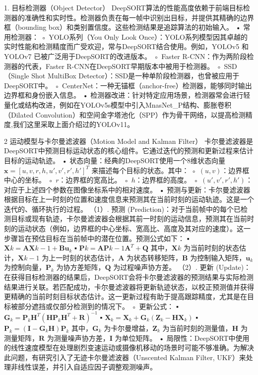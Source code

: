 1. 目标检测器（Object Detector）
DeepSORT算法的性能高度依赖于前端目标检测器的准确性和实时性。检测器负责在每一帧中识别出目标，并提供其精确的边界框（bounding box）和类别置信度。这些检测结果是追踪算法的初始输入。
• 常用检测器：
    ◦ YOLO系列（You Only Look Once）：YOLO系列模型因其卓越的实时性能和检测精度而广受欢迎，常与DeepSORT结合使用。例如，YOLOv5 和YOLOv7 已被广泛用于DeepSORT的改进版本。
    ◦ Faster R-CNN：作为两阶段检测器的代表，Faster R-CNN在DeepSORT早期版本中被用于检测器。
    ◦ SSD（Single Shot MultiBox Detector）：SSD是一种单阶段检测器，也曾被应用于DeepSORT中。
    ◦ CenterNet：一种无锚框（anchor-free）检测器，能够同时输出边界框和身份嵌入信息。
• 检测器改进：针对特定应用场景，检测器常会进行轻量化或结构改进，例如在YOLOv5s模型中引入MnasNet_P结构、膨胀卷积（Dilated Convolution）和空间金字塔池化（SPP）作为骨干网络，以提高检测精度,我们这里采取上面介绍过的YOLOv11。

2 运动模型与卡尔曼滤波器（Motion Model and Kalman Filter）
卡尔曼滤波器是DeepSORT中预测目标运动状态的核心组件。它通过迭代的预测和更新过程来估计目标的运动轨迹。
• 状态向量：经典的DeepSORT使用一个8维状态向量 $\mathbf{x} = [u, v, r, h, u', v', r', h']^T$ 来描述每个目标的状态。其中：
    ◦ $(u, v)$：边界框中心的坐标。
    ◦ $r$：边界框的宽高比。
    ◦ $h$：边界框的高度。
    ◦ $(u', v', r', h')$：对应于上述四个参数在图像坐标系中的相对速度。
• 预测与更新：卡尔曼滤波器根据目标在上一时刻的位置和速度信息来预测其在当前时刻的运动轨迹。这是一个迭代的、循环执行的过程。
（1）. 预测 (Prediction)：对于当前帧中的每个已检测目标或现有轨迹，卡尔曼滤波器会根据其前一时刻的运动信息，预测其在当前时刻的运动状态（例如，边界框的中心坐标、宽高比、高度及其对应的速度）。这一步骤旨在预估目标在当前帧中的潜在位置。预测公式如下：
        ▪ $\mathbf{X}k = \mathbf{A}\mathbf{X}{k-1} + \mathbf{B}\mathbf{u}_k$
        ▪ $\mathbf{P}k = \mathbf{A}\mathbf{P}{k-1}\mathbf{A}^T + \mathbf{Q}$ 其中，$\mathbf{X}k$ 为当前时刻的状态估计，$ \mathbf{X}{k-1}$ 为上一时刻的状态估计，$\mathbf{A}$ 为状态转移矩阵，$\mathbf{B}$ 为控制输入矩阵，$\mathbf{u}_k$ 为控制向量，$\mathbf{P}_k$ 为协方差矩阵，$\mathbf{Q}$ 为过程噪声协方差。
（2）. 更新 (Update)：在获得目标检测器的结果后，DeepSORT会将卡尔曼滤波器的预测结果与实际检测结果进行关联。若匹配成功，卡尔曼滤波器将更新轨迹状态，以校正预测值并获得更精确的当前时刻目标状态估计。这一更新过程有助于提高跟踪精度，尤其是在目标被部分遮挡或仅部分检测到的情况下。  
    ◦ 更新公式：
        ▪ $\mathbf{G}_k = \mathbf{P}_k\mathbf{H}^T (\mathbf{H}\mathbf{P}_k\mathbf{H}^T + \mathbf{R})^{-1}$
        ▪ $\mathbf{X}_k = \mathbf{X}_k + \mathbf{G}_k (\mathbf{Z}_k - \mathbf{H}\mathbf{X}_k)$
        ▪ $\mathbf{P}_k = (\mathbf{I} - \mathbf{G}_k\mathbf{H})\mathbf{P}_k$ 其中，$\mathbf{G}_k$ 为卡尔曼增益，$\mathbf{Z}_k$ 为当前时刻的测量值，$\mathbf{H}$ 为测量矩阵，$\mathbf{R}$ 为测量噪声协方差，$\mathbf{I}$ 为单位矩阵。
• 局限性：DeepSORT中使用的线性速度模型在处理剧烈变速运动或摄像机移动的场景时可能不够准确。为解决此问题，有研究引入了无迹卡尔曼滤波器（Unscented Kalman Filter, UKF）来处理非线性误差，并引入自适应因子调整观测噪声。

